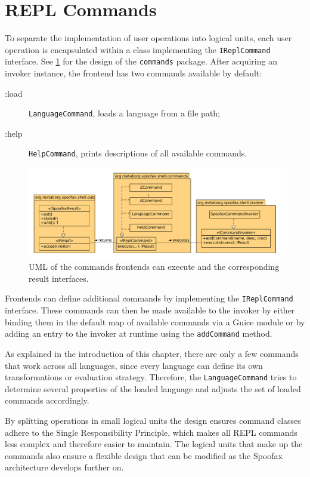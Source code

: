 \section{REPL Commands}
\label{sec:commands}

To separate the implementation of user operations into logical units, each user
operation is encapsulated within a class implementing the
\texttt{IReplCommand} interface. See \cref{fig:uml-commands} for the design
of the \texttt{commands} package. After acquiring an invoker instance, the
frontend has two commands available by default:

\begin{description}
  \item [:load] \texttt{LanguageCommand}, loads a language from a file path;
  \item [:help] \texttt{HelpCommand}, prints descriptions of all available commands.
\end{description}

\begin{figure}[h]
  \centering
  \includegraphics[width=\textwidth]{uml-commands}
  \caption{UML of the commands frontends can execute and the
           corresponding result interfaces.}
  \label{fig:uml-commands}
\end{figure}

Frontends can define additional commands by implementing the
\texttt{IReplCommand} interface. These commands can then be made available
to the invoker by either binding them in the default map of available commands
via a Guice module or by adding an entry to the invoker at runtime using the
\texttt{addCommand} method.

As explained in the introduction of this chapter, there are only a few
commands that work across all languages, since every language can define its
own transformations or evaluation strategy. Therefore, the
\texttt{LanguageCommand} tries to determine several properties of the loaded
language and adjusts the set of loaded commands accordingly.

By splitting operations in small logical units the design ensures command
classes adhere to the Single Responsibility Principle, which makes all REPL
commands less complex and therefore easier to maintain. The logical units that
make up the commands also ensure a flexible design that can be modified
as the Spoofax architecture develops further on.


